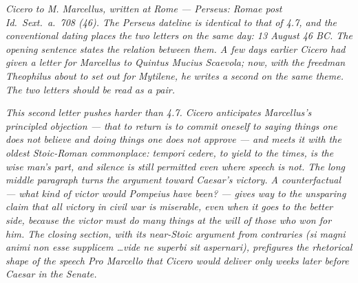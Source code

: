 
\textit{Cicero to M. Marcellus, written at Rome --- Perseus:
\textit{Romae post Id.~Sext.~a.~708 (46)}. The Perseus dateline
is identical to that of 4.7, and the conventional dating places
the two letters on the same day: 13 August 46 BC. The opening
sentence states the relation between them. A few days earlier
Cicero had given a letter for Marcellus to Quintus Mucius
Scaevola; now, with the freedman Theophilus about to set out for
Mytilene, he writes a second on the same theme. The two letters
should be read as a pair.}

\textit{This second letter pushes harder than 4.7. Cicero
anticipates Marcellus's principled objection --- that to return
is to commit oneself to saying things one does not believe and
doing things one does not approve --- and meets it with the
oldest Stoic-Roman commonplace: \textit{tempori cedere}, to
yield to the times, is the wise man's part, and silence is still
permitted even where speech is not. The long middle paragraph
turns the argument toward Caesar's victory. A counterfactual ---
what kind of victor would Pompeius have been? --- gives way to
the unsparing claim that all victory in civil war is miserable,
even when it goes to the better side, because the victor must
do many things at the will of those who won for him. The closing
section, with its near-Stoic argument from contraries (\textit{si
magni animi non esse supplicem \dots vide ne superbi sit
aspernari}), prefigures the rhetorical shape of the speech
\textit{Pro Marcello} that Cicero would deliver only weeks
later before Caesar in the Senate.}
